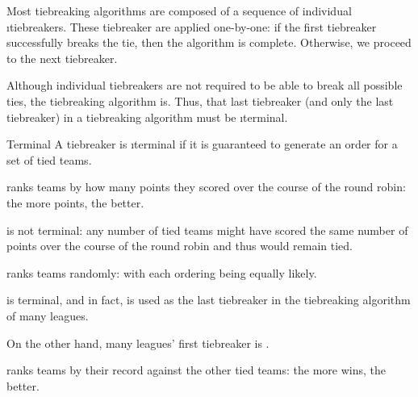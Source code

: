 {    Most tiebreaking algorithms are composed of a sequence of individual \i{tiebreakers}. These tiebreaker are applied one-by-one: if the first tiebreaker successfully breaks the tie, then the algorithm is complete. Otherwise, we proceed to the next tiebreaker.

    Although individual tiebreakers are not required to be able to break all possible ties, the tiebreaking algorithm is. Thus, that last tiebreaker (and only the last tiebreaker) in a tiebreaking algorithm must be \i{terminal}.

    \begin{definition}{Terminal}{}
        A tiebreaker is \i{terminal} if it is guaranteed to generate an order for a set of tied teams.
    \end{definition}

    \begin{definition}{}{}
         ranks teams by how many points they scored over the course of the round robin: the more points, the better.
    \end{definition}

     is not terminal: any number of tied teams might have scored the same number of points over the course of the round robin and thus would remain tied.

    \begin{definition}{}{}
         ranks teams randomly: with each ordering being equally likely.
    \end{definition}

     is terminal, and in fact,  is used as the last tiebreaker in the tiebreaking algorithm of many leagues.

    On the other hand, many leagues' first tiebreaker is .

    \begin{definition}{}{}
         ranks teams by their record against the other tied teams: the more wins, the better.
    \end{definition}

    }

